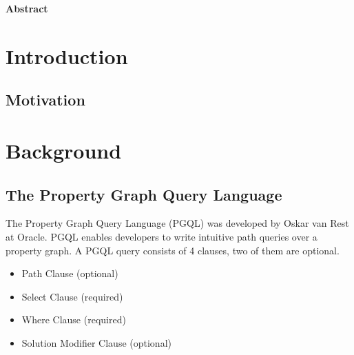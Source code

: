 \documentclass[11pt,singlecolumn]{scrartcl}
\begin{document}
\hspace{60mm}
\begin{center}
 \textbf{Abstract} \end{center}



\clearpage
\tableofcontents
\clearpage
\section{Introduction}
\subsection{Motivation}

\clearpage

\section{Background}
\subsection{The Property Graph Query Language}

The Property Graph Query Language (PGQL) was developed by Oskar van Rest at Oracle. \cite{vanRest:2016} PGQL enables developers to write intuitive path queries over a property graph. A PGQL query consists of 4 clauses, two of them are optional.
\begin{itemize} 
\item Path Clause (optional)
\item Select Clause (required)
\item Where Clause (required)
\item Solution Modifier Clause (optional)
\end{itemize}
\end{document}

